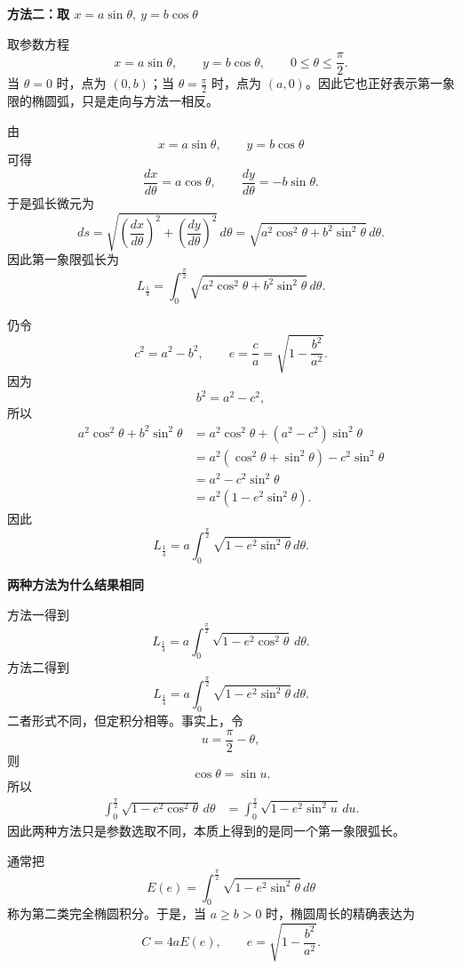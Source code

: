 \begin{proofbox}
	\medskip
	\textbf{\textcolor{CProof}{方法二：取 \(x=a\sin\theta,\ y=b\cos\theta\)}}

	取参数方程
	\[
		x=a\sin\theta,\qquad y=b\cos\theta,
		\qquad 0\le \theta\le \frac{\pi}{2}.
	\]
	当 \(\theta=0\) 时，点为 \((0,b)\)；当 \(\theta=\frac{\pi}{2}\) 时，点为 \((a,0)\)。因此它也正好表示第一象限的椭圆弧，只是走向与方法一相反。

	由
	\[
		x=a\sin\theta,\qquad y=b\cos\theta
	\]
	可得
	\[
		\frac{dx}{d\theta}=a\cos\theta,
		\qquad
		\frac{dy}{d\theta}=-b\sin\theta.
	\]
	于是弧长微元为
	\[
		ds
		=
		\sqrt{
			\left(\frac{dx}{d\theta}\right)^2
			+
			\left(\frac{dy}{d\theta}\right)^2
		}
		\,d\theta
		=
		\sqrt{
			a^2\cos^2\theta+b^2\sin^2\theta
		}
		\,d\theta.
	\]
	因此第一象限弧长为
	\[
		L_{\frac14}
		=
		\int_0^{\frac{\pi}{2}}
		\sqrt{
			a^2\cos^2\theta+b^2\sin^2\theta
		}
		\,d\theta.
	\]

	仍令
	\[
		c^2=a^2-b^2,
		\qquad
		e=\frac{c}{a}
		=
		\sqrt{1-\frac{b^2}{a^2}}.
	\]
	因为
	\[
		b^2=a^2-c^2,
	\]
	所以
	\[
		\begin{aligned}
			a^2\cos^2\theta+b^2\sin^2\theta
			 & =
			a^2\cos^2\theta+(a^2-c^2)\sin^2\theta          \\[0.4em]
			 & =
			a^2(\cos^2\theta+\sin^2\theta)-c^2\sin^2\theta \\[0.4em]
			 & =
			a^2-c^2\sin^2\theta                            \\[0.4em]
			 & =
			a^2\left(1-e^2\sin^2\theta\right).
		\end{aligned}
	\]
	因此
	\[
		L_{\frac14}
		=
		a\int_0^{\frac{\pi}{2}}
		\sqrt{1-e^2\sin^2\theta}
		\,d\theta.
	\]

	\medskip
	\textbf{\textcolor{CProof}{两种方法为什么结果相同}}

	方法一得到
	\[
		L_{\frac14}
		=
		a\int_0^{\frac{\pi}{2}}
		\sqrt{1-e^2\cos^2\theta}
		\,d\theta.
	\]
	方法二得到
	\[
		L_{\frac14}
		=
		a\int_0^{\frac{\pi}{2}}
		\sqrt{1-e^2\sin^2\theta}
		\,d\theta.
	\]
	二者形式不同，但定积分相等。事实上，令
	\[
		u=\frac{\pi}{2}-\theta,
	\]
	则
	\[
		\cos\theta=\sin u.
	\]
	所以
	\[
		\begin{aligned}
			\int_0^{\frac{\pi}{2}}
			\sqrt{1-e^2\cos^2\theta}
			\,d\theta
			 & =
			\int_0^{\frac{\pi}{2}}
			\sqrt{1-e^2\sin^2 u}
			\,du.
		\end{aligned}
	\]
	因此两种方法只是参数选取不同，本质上得到的是同一个第一象限弧长。

	通常把
	\[
		E(e)
		=
		\int_0^{\frac{\pi}{2}}
		\sqrt{1-e^2\sin^2\theta}
		\,d\theta
	\]
	称为第二类完全椭圆积分。于是，当 \(a\ge b>0\) 时，椭圆周长的精确表达为
	\[
		\boxed{
			C=4aE(e)
		},
		\qquad
		e=\sqrt{1-\frac{b^2}{a^2}}.
	\]


\end{proofbox}
